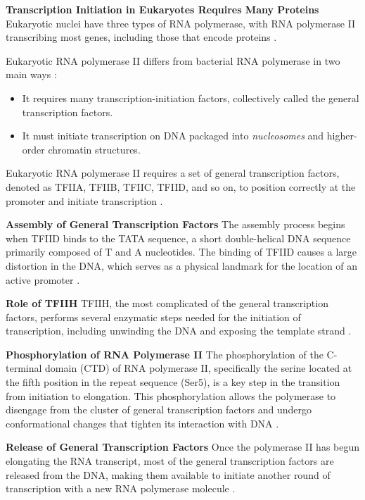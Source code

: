 \textbf{Transcription Initiation in Eukaryotes Requires Many Proteins}
Eukaryotic nuclei have three types of RNA polymerase, with RNA polymerase II transcribing most genes, including those that encode proteins \cite*{L1-Chapter6}.

Eukaryotic RNA polymerase II differs from bacterial RNA polymerase in two main ways \cite*{L1-Chapter6}:
\begin{highlight}
    \begin{itemize}
        \item It requires many transcription-initiation factors, collectively called the general transcription factors.
        \item It must initiate transcription on DNA packaged into \textit{nucleosomes} and higher-order chromatin structures.
    \end{itemize}
\end{highlight}

Eukaryotic RNA polymerase II requires a set of general transcription factors, denoted as TFIIA, TFIIB, TFIIC, TFIID, and so on, to position correctly at the promoter and initiate transcription \cite*{L1-Chapter6}.

\textbf{Assembly of General Transcription Factors}
The assembly process begins when TFIID binds to the TATA sequence, a short double-helical DNA sequence primarily composed of T and A nucleotides. The binding of TFIID causes a large distortion in the DNA, which serves as a physical landmark for the location of an active promoter \cite*{L1-Chapter6}.

\textbf{Role of TFIIH}
TFIIH, the most complicated of the general transcription factors, performs several enzymatic steps needed for the initiation of transcription, including unwinding the DNA and exposing the template strand \cite*{L1-Chapter6}.

\textbf{Phosphorylation of RNA Polymerase II}
The phosphorylation of the C-terminal domain (CTD) of RNA polymerase II, specifically the serine located at the fifth position in the repeat sequence (Ser5), is a key step in the transition from initiation to elongation. This phosphorylation allows the polymerase to disengage from the cluster of general transcription factors and undergo conformational changes that tighten its interaction with DNA \cite*{L1-Chapter6}.

\textbf{Release of General Transcription Factors} 
Once the polymerase II has begun elongating the RNA transcript, most of the general transcription factors are released from the DNA, making them available to initiate another round of transcription with a new RNA polymerase molecule \cite*{L1-Chapter6}.

